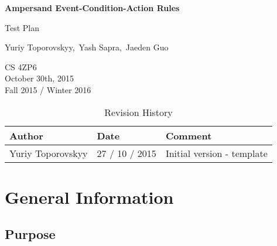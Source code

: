 \documentclass[12pt]{report}
\begin{document}
\begin{titlepage}\begin{center}
\thispagestyle{empty} %

\vspace*{1cm}

{\Huge\textbf{Ampersand Event-Condition-Action Rules}}

\vspace{0.5cm}
{\Large Test Plan

\vspace{1.5cm}
Yuriy Toporovskyy,\ Yash Sapra,\ Jaeden Guo}
\vfill 


\end{center}
CS 4ZP6 \\
October 30th, 2015 \\ 
Fall 2015 / Winter 2016 
\end{titlepage}


\begin{table}[ht!]\begin{center}
\caption{Revision History}  
\begin{tabular}{|l|l|l|}\hline
\textbf{Author} & \textbf{Date} & \textbf{Comment} \\\hline 
Yuriy Toporovskyy & 27 / 10 / 2015 & Initial version - template \\\hline
\end{tabular}
\end{center}\end{table}

\newpage

\tableofcontents
\listoffigures
\listoftables

\newpage
{} %

%
%

\chapter{General Information}

\section{Purpose} 
\end{document}
